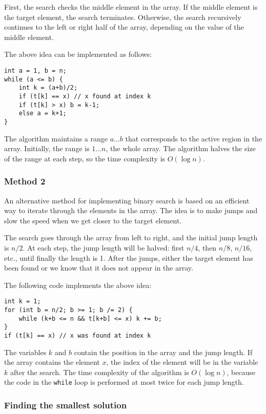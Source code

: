 First, the search checks the middle element in the array.
If the middle element is the target element,
the search terminates.
Otherwise, the search recursively continues
to the left or right half of the array,
depending on the value of the middle element.

The above idea can be implemented as follows:
\begin{lstlisting}
int a = 1, b = n;
while (a <= b) {
    int k = (a+b)/2;
    if (t[k] == x) // x found at index k
    if (t[k] > x) b = k-1;
    else a = k+1;
}
\end{lstlisting}

The algorithm maintains a range $a \ldots b$
that corresponds to the active region in the array.
Initially, the range is $1 \ldots n$, the whole array.
The algorithm halves the size of the range at each step,
so the time complexity is $O(\log n)$.

\subsubsection{Method 2}

An alternative method for implementing binary search
is based on an efficient way to iterate through
the elements in the array.
The idea is to make jumps and slow the speed
when we get closer to the target element.

The search goes through the array from left to
right, and the initial jump length is $n/2$.
At each step, the jump length will be halved:
first $n/4$, then $n/8$, $n/16$, etc., until
finally the length is 1.
After the jumps, either the target element has
been found or we know that it does not appear in the array.

The following code implements the above idea:
\begin{lstlisting}
int k = 1;
for (int b = n/2; b >= 1; b /= 2) {
    while (k+b <= n && t[k+b] <= x) k += b;
}
if (t[k] == x) // x was found at index k
\end{lstlisting}

The variables $k$ and $b$ contain the position
in the array and the jump length.
If the array contains the element $x$,
the index of the element will be in the variable $k$
after the search.
The time complexity of the algorithm is $O(\log n)$,
because the code in the \texttt{while} loop
is performed at most twice for each jump length.

\subsubsection{Finding the smallest solution}

